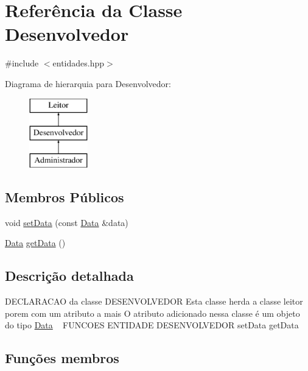 \hypertarget{class_desenvolvedor}{}\section{Referência da Classe Desenvolvedor}
\label{class_desenvolvedor}


{\ttfamily \#include $<$entidades.\+hpp$>$}

Diagrama de hierarquia para Desenvolvedor\+:\begin{figure}[H]
\begin{center}
\leavevmode
\includegraphics[height=3.000000cm]{class_desenvolvedor}
\end{center}
\end{figure}
\subsection*{Membros Públicos}
\begin{DoxyCompactItemize}
\item 
void \mbox{\hyperlink{class_desenvolvedor_a17ca20f8623c4e3d21676fd7f4b96575}{set\+Data}} (const \mbox{\hyperlink{class_data}{Data}} \&data)
\item 
\mbox{\hyperlink{class_data}{Data}} \mbox{\hyperlink{class_desenvolvedor_ae32b1caacb1a428d29b3e716d648b170}{get\+Data}} ()
\end{DoxyCompactItemize}


\subsection{Descrição detalhada}
D\+E\+C\+L\+A\+R\+A\+C\+AO da classe D\+E\+S\+E\+N\+V\+O\+L\+V\+E\+D\+OR Esta classe herda a classe leitor porem com um atributo a mais O atributo adicionado nessa classe é um objeto do tipo \mbox{\hyperlink{class_data}{Data}} ~\newline
F\+U\+N\+C\+O\+ES E\+N\+T\+I\+D\+A\+DE D\+E\+S\+E\+N\+V\+O\+L\+V\+E\+D\+OR set\+Data get\+Data 

\subsection{Funções membros}
\mbox{\label{class_desenvolvedor_ae32b1caacb1a428d29b3e716d648b170}} 
